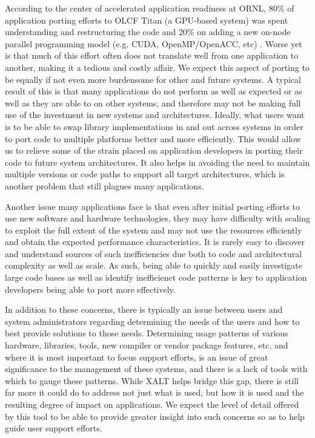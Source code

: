 According to the center of accelerated application readiness at \acs{ORNL}, 80\% of application porting efforts to OLCF Titan (a \acs{GPU}-based system) was spent understanding and restructuring the code and 20\% on adding a new on-node parallel programming model (e.g. CUDA, OpenMP/OpenACC, etc) \cite{titan}.
Worse yet is that much of this effort often does not translate well from one application to another, making it a tedious and costly affair.
We expect this aspect of porting to be equally if not even more burdensome for other and future systems.
A typical result of this is that many applications do not perform as well as expected or as well as they are able to on other systems, and therefore may not be making full use of the investment in new systems and architectures.
Ideally, what users want is to be able to swap library implementations in and out across systems in order to port code to multiple platforms better and more efficiently.
This would allow us to relieve some of the strain placed on application developers in porting their code to future system architectures.
It also helps in avoiding the need to maintain multiple versions or code paths to support all target architectures, which is another problem that still plagues many applications.

Another issue many applications face is that even after initial porting efforts to use new software and hardware technologies, they may have difficulty with scaling to exploit the full extent of the system and may not use the resources efficiently and obtain the expected performance characteristics.
It is rarely easy to discover and understand sources of such inefficiencies due both to code and architectural complexity as well as scale.
As such, being able to quickly and easily investigate large code bases as well as identify inefficienct code patterns is key to application developers being able to port more effectively.

In addition to these concerns, there is typically an issue between users and system administrators regarding determining the needs of the users and how to best provide solutions to those needs.
Determining usage patterns of various hardware, libraries, tools, new compiler or vendor package features, etc, and where it is most important to focus support efforts, is an issue of great significance to the management of these systems, and there is a lack of tools with which to gauge these patterns.
While XALT helps bridge this gap, there is still far more it could do to address not just what is used, but how it is used and the resulting degree of impact on applications.
We expect the level of detail offered by this tool to be able to provide greater insight into such concerns so as to help guide user support efforts.

